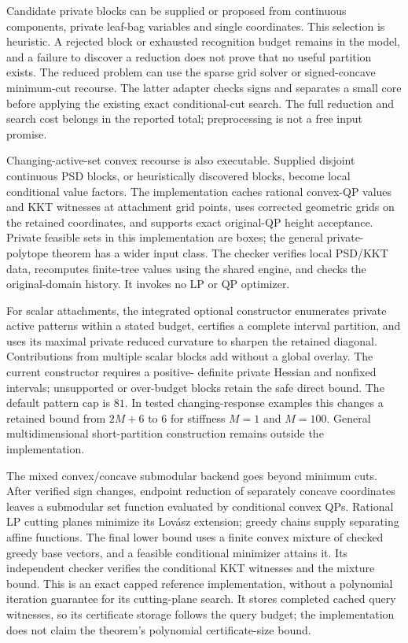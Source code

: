 Candidate private blocks can be supplied or proposed from continuous
components, private leaf-bag variables and single coordinates. This
selection is heuristic. A rejected block or exhausted recognition budget
remains in the model, and a failure to discover a reduction does not prove
that no useful partition exists. The reduced problem can use the sparse
grid solver or signed-concave minimum-cut recourse. The latter adapter
checks signs and separates a small core before applying the existing exact
conditional-cut search. The full reduction and search cost belongs in the
reported total; preprocessing is not a free input promise.

Changing-active-set convex recourse is also executable. Supplied disjoint
continuous PSD blocks, or heuristically discovered blocks, become local
conditional value factors. The implementation caches rational convex-QP
values and KKT witnesses at attachment grid points, uses corrected geometric
grids on the retained coordinates, and supports exact original-QP height
acceptance. Private feasible sets in this implementation are boxes; the
general private-polytope theorem has a wider input class. The checker
verifies local PSD/KKT data, recomputes finite-tree values using the shared
engine, and checks the original-domain history. It invokes no LP or QP
optimizer.

For scalar attachments, the integrated optional constructor enumerates
private active patterns within a stated budget, certifies a complete
interval partition, and uses its maximal private reduced curvature to
sharpen the retained diagonal. Contributions from multiple scalar blocks
add without a global overlay. The current constructor requires a positive-
definite private Hessian and nonfixed intervals; unsupported or over-budget
blocks retain the safe direct bound. The default pattern cap is $81$.
In tested changing-response examples this changes a retained bound from
$2M+6$ to $6$ for stiffness $M=1$ and $M=100$. General multidimensional
short-partition construction remains outside the implementation.

The mixed convex/concave submodular backend goes beyond minimum cuts.
After verified sign changes, endpoint reduction of separately concave
coordinates leaves a submodular set function evaluated by conditional
convex QPs. Rational LP cutting planes minimize its Lov\'asz extension;
greedy chains supply separating affine functions. The final lower bound
uses a finite convex mixture of checked greedy base vectors, and a feasible
conditional minimizer attains it. Its independent checker verifies the
conditional KKT witnesses and the mixture bound. This is an exact capped
reference implementation, without a polynomial iteration guarantee for
its cutting-plane search. It stores completed cached query witnesses, so
its certificate storage follows the query budget; the implementation does
not claim the theorem's polynomial certificate-size bound.


